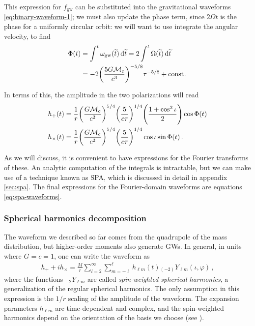 \documentclass[main.tex]{subfiles}
\begin{document}

This expression for \(f _{\text{gw}}\) can be substituted into the gravitational waveforms \eqref{eq:binary-waveform-1}; we must also update the phase term, since \(2 \Omega t\) is the phase for a uniformly circular orbit: we will want to use integrate the angular velocity, to find 
%
\begin{align} \label{eq:phase-quadrupole-emission}
\Phi (t) &= \int^{t} \omega _{\text{gw}}(\widetilde{t}) \dd{\widetilde{t}} = 2 \int^{t} \Omega (\widetilde{t}) \dd{\widetilde{t}}  \\
&= -2 \qty(\frac{5 G \mathcal{M}_c}{c^3})^{-5/8} \tau^{-5/8} + \text{const}
\,.
\end{align}

In terms of this, the amplitude in the two polarizations will read \cite[eqs.\ 4.31--32]{maggioreGravitationalWavesVolume2007}
%
\begin{align} \label{eq:amplitude-quadrupole-emission}
h_{+} (t) &= \frac{1}{r} \qty(\frac{G \mathcal{M}_c}{c^2})^{5/4} \qty( \frac{5}{c \tau })^{1/4} \qty(\frac{1 + \cos^2\iota }{2}) \cos \Phi (t) \\
h_{ \times } (t) &= \frac{1}{r} \qty(\frac{G \mathcal{M}_c}{c^2})^{5/4} \qty( \frac{5}{c \tau })^{1/4} \cos \iota  \sin \Phi (t) 
\,.
\end{align}

As we will discuss, it is convenient to have expressions for the Fourier transforms of these. An analytic computation of the integrals is intractable, but we can make use of a technique known as \ac{SPA}, which is discussed in detail in appendix \ref{sec:spa}. 
The final expressions for the Fourier-domain waveforms are equations \eqref{eq:spa-waveforms}. 

\subsubsection{Spherical harmonics decomposition}

The waveform we described so far comes from the quadrupole of the mass distribution, but higher-order moments also generate \acp{GW}.
In general, in units where \(G = c = 1\), one can write the waveform as \cite[eq.\ II.6]{ajithDataFormatsNumerical2011}
%
\begin{align}
h_+ + i h_\times = \frac{M}{r} \sum _{l=2}^{\infty } \sum _{m=-\ell}^{\ell} h_{\ell m} (t) {}_{(-2)}Y_{\ell m} (\iota, \varphi )
\,,
\end{align}
%
where the functions \({}_{-2}Y_{\ell m}\) are called \emph{spin-weighted spherical harmonics}, a generalization of the regular spherical harmonics. 
The only assumption in this expression is the \(1/r\) scaling of the amplitude of the waveform. 
The expansion parameters \(h_{\ell m}\) are time-dependent and complex, and the spin-weighted harmonics depend on the orientation of the basis we choose (see ).
\end{document}
